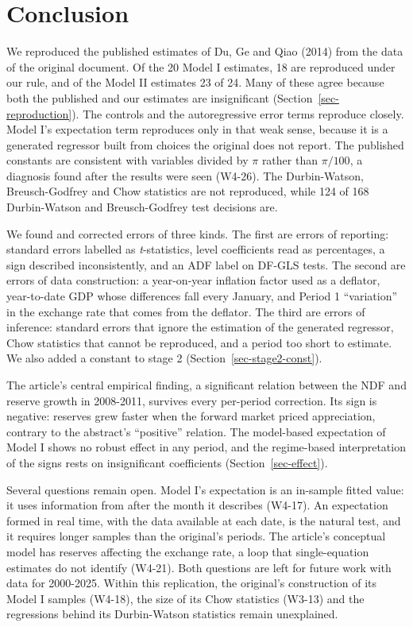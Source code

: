 \documentclass[
  12pt,
  a4paper,
]{article}
\begin{document}
\section{Conclusion}\label{sec-conclusion}

We reproduced the published estimates of Du, Ge and Qiao (2014) from the
data of the original document. Of the 20 Model I estimates, 18 are
reproduced under our rule, and of the Model II estimates 23 of 24. Many
of these agree because both the published and our estimates are
insignificant (Section~\ref{sec-reproduction}). The controls and the
autoregressive error terms reproduce closely. Model I's expectation term
reproduces only in that weak sense, because it is a generated regressor
built from choices the original does not report. The published constants
are consistent with variables divided by \(\pi\) rather than
\(\pi/100\), a diagnosis found after the results were seen (W4-26). The
Durbin-Watson, Breusch-Godfrey and Chow statistics are not reproduced,
while 124 of 168 Durbin-Watson and Breusch-Godfrey test decisions are.

We found and corrected errors of three kinds. The first are errors of
reporting: standard errors labelled as \emph{t}-statistics, level
coefficients read as percentages, a sign described inconsistently, and
an ADF label on DF-GLS tests. The second are errors of data
construction: a year-on-year inflation factor used as a deflator,
year-to-date GDP whose differences fall every January, and Period 1
``variation'' in the exchange rate that comes from the deflator. The
third are errors of inference: standard errors that ignore the
estimation of the generated regressor, Chow statistics that cannot be
reproduced, and a period too short to estimate. We also added a constant
to stage 2 (Section~\ref{sec-stage2-const}).

The article's central empirical finding, a significant relation between
the NDF and reserve growth in 2008-2011, survives every per-period
correction. Its sign is negative: reserves grew faster when the forward
market priced appreciation, contrary to the abstract's ``positive''
relation. The model-based expectation of Model I shows no robust effect
in any period, and the regime-based interpretation of the signs rests on
insignificant coefficients (Section~\ref{sec-effect}).

Several questions remain open. Model I's expectation is an in-sample
fitted value: it uses information from after the month it describes
(W4-17). An expectation formed in real time, with the data available at
each date, is the natural test, and it requires longer samples than the
original's periods. The article's conceptual model has reserves
affecting the exchange rate, a loop that single-equation estimates do
not identify (W4-21). Both questions are left for future work with data
for 2000-2025. Within this replication, the original's construction of
its Model I samples (W4-18), the size of its Chow statistics (W3-13) and
the regressions behind its Durbin-Watson statistics remain unexplained.
\end{document}
